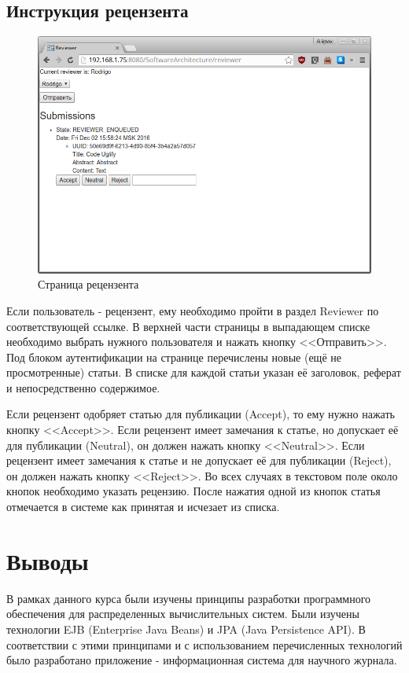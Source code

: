 \subsection{Инструкция рецензента}

\begin{figure}[H]
\centering
\includegraphics[width=\textwidth]{reviewer.png}
\caption{Страница рецензента}
\end{figure}

Если пользователь - рецензент, ему необходимо пройти в раздел Reviewer по соответствующей ссылке. В верхней части страницы в выпадающем списке необходимо выбрать нужного пользователя и нажать кнопку <<Отправить>>. Под блоком аутентификации на странице перечислены новые (ещё не просмотренные) статьи. В списке для каждой статьи указан её заголовок, реферат и непосредственно содержимое.

Если рецензент одобряет статью для публикации (Accept), то ему нужно нажать кнопку <<Accept>>. Если рецензент имеет замечания к статье, но допускает её для публикации (Neutral), он должен нажать кнопку <<Neutral>>. Если рецензент имеет замечания к статье и не допускает её для публикации (Reject), он должен нажать кнопку <<Reject>>. Во всех случаях в текстовом поле около кнопок необходимо указать рецензию. После нажатия одной из кнопок статья отмечается в системе как принятая и исчезает из списка.

\section{Выводы}
В рамках данного курса были изучены принципы разработки программного обеспечения для распределенных вычислительных систем. Были изучены технологии EJB (Enterprise Java Beans) и JPA (Java Persistence API). В соответствии с этими принципами и с использованием перечисленных технологий было разработано приложение - информационная система для научного журнала.


